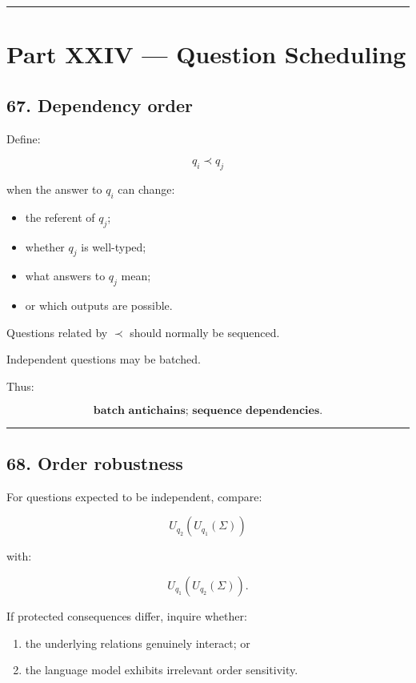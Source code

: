 \documentclass[
]{article}
\providecommand{\tightlist}{%
  \setlength{\itemsep}{0pt}\setlength{\parskip}{0pt}}
\begin{document}
\begin{center}\rule{0.5\linewidth}{0.5pt}\end{center}

\section{Part XXIV --- Question
Scheduling}\label{part-xxiv-question-scheduling}

\subsection{67. Dependency order}\label{dependency-order}

Define:

\[
q_i\prec q_j
\]

when the answer to \(q_i\) can change:

\begin{itemize}
\tightlist
\item
  the referent of \(q_j\);
\item
  whether \(q_j\) is well-typed;
\item
  what answers to \(q_j\) mean;
\item
  or which outputs are possible.
\end{itemize}

Questions related by \(\prec\) should normally be sequenced.

Independent questions may be batched.

Thus:

\[
\boxed{
\textbf{batch antichains; sequence dependencies.}
}
\]

\begin{center}\rule{0.5\linewidth}{0.5pt}\end{center}

\subsection{68. Order robustness}\label{order-robustness}

For questions expected to be independent, compare:

\[
U_{q_2}(U_{q_1}(\Sigma))
\]

with:

\[
U_{q_1}(U_{q_2}(\Sigma)).
\]

If protected consequences differ, inquire whether:

\begin{enumerate}
\def\labelenumi{\arabic{enumi}.}
\tightlist
\item
  the underlying relations genuinely interact; or
\item
  the language model exhibits irrelevant order sensitivity.
\end{enumerate}
\end{document}
